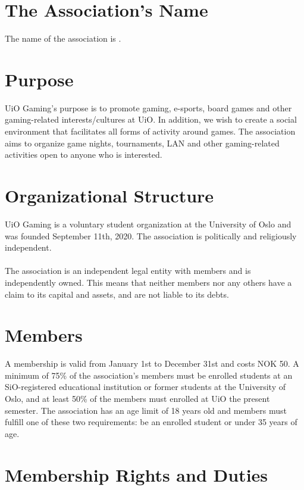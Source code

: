 \documentclass[12pt,a4paper,norsk]{article}
\begin{document}
\section{The Association's Name}

The name of the association is .


\section{Purpose}

UiO Gaming's purpose is to promote gaming, e-sports, board games and other gaming-related interests/cultures at UiO. In addition, we wish to create a social environment that facilitates all forms of activity around games. The association aims to organize game nights,
tournaments, LAN and other gaming-related activities open to anyone who is interested.



\section{Organizational Structure}

UiO Gaming is a voluntary student organization at the University of Oslo and was founded
September 11th, 2020. The association is politically and religiously independent.
\\
\\
The association is an independent legal entity with members and is independently owned. This means that neither members nor any others have a claim to its capital and assets, and are not liable to its debts.



\section{Members}

A membership is valid from January 1st to December 31st and costs NOK 50. A minimum of 75\% of
the association's members must be enrolled students at an SiO-registered educational institution or
former students at the University of Oslo, and at least 50\% of the members must enrolled
at UiO the present semester. The association has an age limit of 18 years old and members must
fulfill one of these two requirements: be an enrolled student or under 35 years of age.



\section{Membership Rights and Duties}
\end{document}
